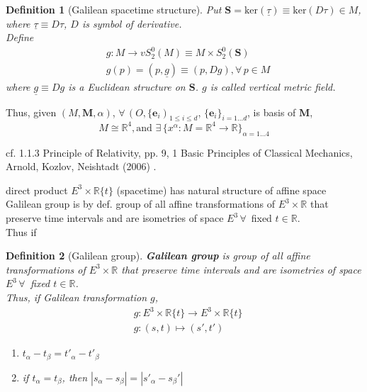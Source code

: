 \documentclass[10pt]{amsart}
\newtheorem{definition}{Definition}
\begin{document}
\begin{multicols*}{2}
\begin{definition}[Galilean spacetime structure]
Put $\mathbf{S} = \text{ker}(\underline{\tau}) \equiv \text{ker}(D\tau)\in M$, \\
	where $\underline{\tau} \equiv D\tau$, $D$ is symbol of derivative.\\	
	Define 
	\[
	\begin{aligned}
	& g: M \to vS_2^0(M) \equiv M \times S_2^0(\mathbf{S}) \\ 
	& g(p) = (p, \underline{g})  \equiv (p, Dg) , \forall \, p \in M
	\end{aligned}
	\]
	where $\underline{g} \equiv Dg$ is a Euclidean structure on $\mathbf{S}$.  $g$ is called vertical metric field.
\end{definition}

Thus, given $(M, \mathbf{M}, \alpha)$, $\forall \, (O, \lbrace \mathbf{e}_i)_{1 \leq i \leq d}$, $\lbrace \mathbf{e}_i \rbrace_{i=1\dots d}$, is basis of $\mathbf{M}$, 
\[
M \cong \mathbb{R}^4, \text{and } \exists \, \lbrace x^{\alpha} : M = \mathbb{R}^4 \to \mathbb{R} \rbrace_{\alpha = 1 \dots 4}
\]

cf. 1.1.3 Principle of Relativity, pp. 9, 1 Basic Principles of Classical Mechanics, Arnold, Kozlov, Neishtadt (2006) \cite{AKN2006}.

direct product $E^3 \times \mathbb{R}\lbrace t \rbrace$ (spacetime) has natural structure of affine space \\
Galilean group is by def. group of all affine transformations of $E^3 \times \mathbb{R}$ that preserve time intervals and are isometries of space $E^3 \, \forall \,$ fixed $t\in \mathbb{R}$.  \\

Thus if 
\begin{definition}[Galilean group]\label{Def:GalileanGroup}
\textbf{Galilean group} is group of all affine transformations of $E^3 \times \mathbb{R}$ that preserve time intervals and are isometries of space $E^3 \, \forall \, $ fixed $t\in \mathbb{R}$. \\

Thus, if Galilean transformation $g$, 
\begin{equation}
\begin{aligned}
& g: E^3 \times \mathbb{R}\lbrace t\rbrace \to E^3 \times \mathbb{R} \lbrace t \rbrace \\
& g:(s,t) \mapsto (s', t')
\end{aligned}
\end{equation}
\begin{enumerate}
	\item $t_{\alpha} - t_{\beta} = t'_{\alpha} - t'_{\beta}$ \\
	\item if $t_{\alpha} = t_{\beta}$, then $|s_{\alpha} - s_{\beta} | = |s'_{\alpha} - s_{\beta}' |$
\end{enumerate}


\end{definition}
\end{multicols*}
\end{document}
